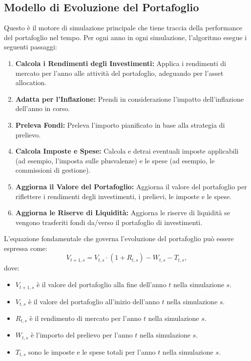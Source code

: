     \subsection{Modello di Evoluzione del
    Portafoglio}\label{subsec:modello-di-evoluzione-del-portafoglio}

Questo è il motore di simulazione principale che tiene traccia della performance
del portafoglio nel tempo.
Per ogni anno in ogni simulazione, l'algoritmo esegue
i seguenti passaggi:
    \begin{enumerate}
        \item \textbf{Calcola i Rendimenti degli Investimenti:} Applica i
        rendimenti di mercato per l'anno alle attività del portafoglio,
        adeguando per l'asset allocation.
        \item \textbf{Adatta per l'Inflazione:} Prendi in considerazione
        l'impatto dell'inflazione dell'anno in corso.
        \item \textbf{Preleva Fondi:} Preleva l'importo pianificato in base alla
        strategia di prelievo.
        \item \textbf{Calcola Imposte e Spese:} Calcola e detrai eventuali
        imposte applicabili (ad esempio, l'imposta sulle plusvalenze) e le spese
        (ad esempio, le commissioni di gestione).
        \item \textbf{Aggiorna il Valore del Portafoglio:} Aggiorna il valore
        del portafoglio per riflettere i rendimenti degli investimenti, i
        prelievi, le imposte e le spese.
        \item \textbf{Aggiorna le Riserve di Liquidità:} Aggiorna le riserve di
        liquidità se vengono trasferiti fondi da/verso il portafoglio di
        investimenti.
    \end{enumerate}

    L'equazione fondamentale che governa l'evoluzione del portafoglio può essere
    espressa come:
    \[
    V_{t+1,s} = V_{t,s} \cdot (1 + R_{t,s}) - W_{t,s} - T_{t,s},
    \]
    dove:
    \begin{itemize}
        \item \(V_{t+1,s}\) è il valore del portafoglio alla fine dell'anno
        \(t\) nella simulazione \(s\).
        \item \(V_{t,s}\) è il valore del portafoglio all'inizio dell'anno \(t\)
        nella simulazione \(s\).
        \item \(R_{t,s}\) è il rendimento di mercato per l'anno \(t\) nella
        simulazione \(s\).
        \item \(W_{t,s}\) è l'importo del prelievo per l'anno \(t\) nella
        simulazione \(s\).
        \item \(T_{t,s}\) sono le imposte e le spese totali per l'anno \(t\)
        nella simulazione \(s\).
    \end{itemize}

